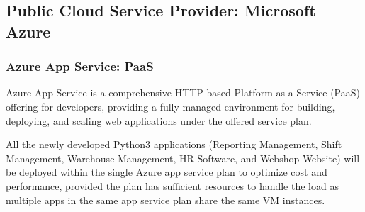 \documentclass{llncs}
\begin{document}
\subsection{Public Cloud Service Provider: Microsoft Azure}
\subsubsection{Azure App Service: PaaS} \leavevmode\newline
Azure App Service is a comprehensive HTTP-based  Platform-as-a-Service (PaaS) offering for developers, providing a fully managed environment for building, deploying, and scaling web applications under the offered service plan.

All the newly developed Python3 applications (Reporting Management, Shift Management, Warehouse Management, HR Software, and Webshop Website) will be deployed within the single Azure app service plan to optimize cost and performance, provided the plan has sufficient resources to handle the load as multiple apps in the same app service plan share the same VM instances.
\end{document}
